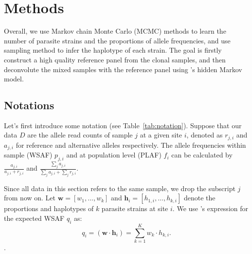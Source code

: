 \documentclass{bioinfo}
\begin{document}
\begin{methods}
\end{methods}

\section{Methods}
Overall, we use Markov chain Monte Carlo (MCMC) methods to learn the number of parasite strains and the proportions of allele frequencies, and use sampling method to infer the haplotype of each strain. The goal is firstly construct a high quality reference panel from the clonal samples, and then deconvolute the mixed samples with the reference panel using \citet{Li2003}'s hidden Markov model.


\subsection{Notations}
Let's first introduce some notation (see Table~\ref{tab:notation}). Suppose that our data $D$ are the allele read counts of sample $j$ at a given site $i$, denoted as $r_{j,i}$ and $a_{j,i}$ for reference and alternative alleles respectively. The allele frequencies within sample (WSAF) $p_{j,i}$ and at population level (PLAF) $f_i$ can be calculated by $ \frac{a_{j,i}}{a_{j,i} + r_{j,i}}$ and $ \frac{\sum_j a_{j,i}}{\sum_j a_{j,i} + \sum_j r_{j,i}}$.

Since all data in this section refers to the same sample, we drop the subscript $j$ from now on. Let $\mathbf w = [w_1,\dots, w_k]$ and $\mathbf{h}_{i} = [h_{1,i},\dots,h_{k,i}]$ denote the proportions and haplotypes of $k$ parasite strains at site $i$. We use \citet{Jack2016}'s expression for the expected WSAF $q_{i}$ as:
\begin{equation}
q_i= (\mathbf{w}\cdot\mathbf{h}_{i})  =  \sum_{k=1}^{K} w_k \cdot h_{k,i} .\label{eqn:qij_full_sum}
\end{equation}.
\end{document}

